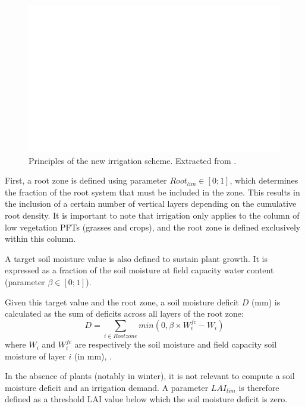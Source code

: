 \begin{figure}[t]
    \centering
    \includegraphics[width=1\textwidth]{images/schema_pedro.png}
    \caption{Principles of the new irrigation scheme. Extracted from \citet{arboleda-obando_validation_2024}.}
    \label{fig:schema_pedro}
\end{figure}

\hfill

First, a root zone is defined using parameter $Root_{lim} \in [0;1]$, which determines the fraction of the root system that must be included in the zone. This results in the inclusion of a certain number of vertical layers depending on the cumulative root density. It is important to note that irrigation only applies to the column of low vegetation PFTs (grasses and crops), and the root zone is defined exclusively within this column.

A target soil moisture value is also defined to sustain plant growth. It is expressed as a fraction of the soil moisture at field capacity water content (parameter $\beta \in [0;1]$).

Given this target value and the root zone, a soil moisture deficit $D$ (mm) is calculated as the sum of deficits across all layers of the root zone:
\begin{equation}
    D = \sum_{i \in Rootzone} min(0,\beta \times W_i^{fc} - W_i)
\end{equation}
where $W_i$ and $W_i^{fc}$ are respectively the soil moisture and field capacity soil moisture of layer $i$ (in mm), .

In the absence of plants (notably in winter), it is not relevant to compute a soil moisture deficit and an irrigation demand. A parameter $LAI_{lim}$ is therefore defined as a threshold LAI value below which the soil moisture deficit is zero.

